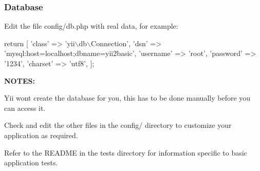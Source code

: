 \subsubsection*{Database}

Edit the file {\ttfamily config/db.\+php} with real data, for example\+:


\begin{DoxyCode}
\textcolor{keywordflow}{return} [
    \textcolor{stringliteral}{'class'} => \textcolor{stringliteral}{'yii\(\backslash\)db\(\backslash\)Connection'},
    \textcolor{stringliteral}{'dsn'} => \textcolor{stringliteral}{'mysql:host=localhost;dbname=yii2basic'},
    \textcolor{stringliteral}{'username'} => \textcolor{stringliteral}{'root'},
    \textcolor{stringliteral}{'password'} => \textcolor{stringliteral}{'1234'},
    \textcolor{stringliteral}{'charset'} => \textcolor{stringliteral}{'utf8'},
];
\end{DoxyCode}


{\bfseries N\+O\+T\+ES\+:}
\begin{DoxyItemize}
\item Yii won\textquotesingle{}t create the database for you, this has to be done manually before you can access it.
\item Check and edit the other files in the {\ttfamily config/} directory to customize your application as required.
\item Refer to the R\+E\+A\+D\+ME in the {\ttfamily tests} directory for information specific to basic application tests. 
\end{DoxyItemize}